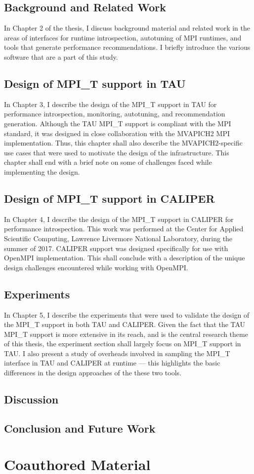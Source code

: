 \subsection {Background and Related Work}
In Chapter 2 of the thesis, I discuss background material and related work in the areas of interfaces for runtime introspection, autotuning of MPI runtimes, and tools that generate performance recommendations. I briefly introduce the various software that are a part of this study.

\subsection {Design of MPI\_T support in TAU}
In Chapter 3, I describe the design of the MPI\_T support in TAU for performance introspection, monitoring, autotuning, and recommendation generation. Although the TAU MPI\_T support is compliant with the MPI standard, it was designed in close collaboration with the MVAPICH2 \cite{MVAPICH2} MPI implementation. Thus, this chapter shall also describe the MVAPICH2-specific use cases that were used to motivate the design of the infrastructure. This chapter shall end with a brief note on some of challenges faced while implementing the design.

\subsection {Design of MPI\_T support in CALIPER}
In Chapter 4, I describe the design of the MPI\_T support in CALIPER for performance introspection. This work was performed at the Center for Applied Scientific Computing, Lawrence Livermore National Laboratory, during the summer of 2017. CALIPER support was designed specifically for use with OpenMPI \cite{OpenMPI} implementation. This shall conclude with a description of the unique design challenges encountered while working with OpenMPI.

\subsection {Experiments}
In Chapter 5, I describe the experiments that were used to validate the design of the MPI\_T support in both TAU and CALIPER. Given the fact that the TAU MPI\_T support is more extensive in its reach, and is the central research theme of this thesis, the experiment section shall largely focus on MPI\_T support in TAU. I also present a study of overheads involved in sampling the MPI\_T interface in TAU and CALIPER at runtime --- this highlights the basic differences in the design approaches of the these two tools.

\subsection {Discussion}

\subsection {Conclusion and Future Work}

\section {Coauthored Material}

